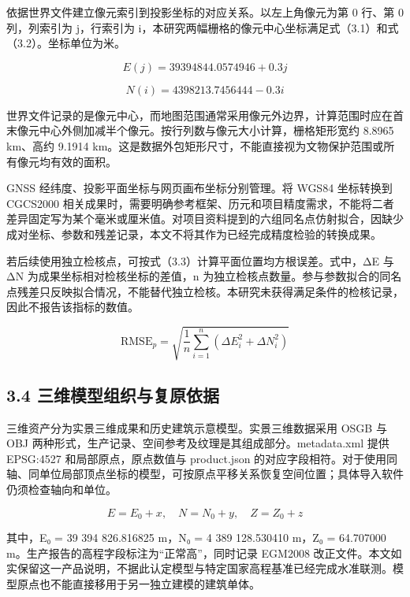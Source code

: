 \documentclass[UTF8,a4paper,zihao=-4]{ctexart}
\begin{document}
依据世界文件建立像元索引到投影坐标的对应关系。以左上角像元为第 0 行、第 0 列，列索引为 j，行索引为 i，本研究两幅栅格的像元中心坐标满足式（3.1）和式（3.2）。坐标单位为米。


\begin{equation}E(j)=39394844.0574946+0.3j\tag{3.1}\end{equation}

\begin{equation}N(i)=4398213.7456444-0.3i\tag{3.2}\end{equation}

世界文件记录的是像元中心，而地图范围通常采用像元外边界，计算范围时应在首末像元中心外侧加减半个像元。按行列数与像元大小计算，栅格矩形宽约 8.8965 km、高约 9.1914 km。这是数据外包矩形尺寸，不能直接视为文物保护范围或所有像元均有效的面积。


GNSS 经纬度、投影平面坐标与网页画布坐标分别管理。将 WGS84 坐标转换到 CGCS2000 相关成果时，需要明确参考框架、历元和项目精度需求，不能将二者差异固定写为某个毫米或厘米值。对项目资料提到的六组同名点仿射拟合，因缺少成对坐标、参数和残差记录，本文不将其作为已经完成精度检验的转换成果。


若后续使用独立检核点，可按式（3.3）计算平面位置均方根误差。式中，ΔE 与 ΔN 为成果坐标相对检核坐标的差值，n 为独立检核点数量。参与参数拟合的同名点残差只反映拟合情况，不能替代独立检核。本研究未获得满足条件的检核记录，因此不报告该指标的数值。


\begin{equation}\mathrm{RMSE}_{p}=\sqrt{\frac{1}{n}\sum_{i=1}^{n}(\Delta E_i^2+\Delta N_i^2)}\tag{3.3}\end{equation}

\subsection*{3.4 三维模型组织与复原依据}

三维资产分为实景三维成果和历史建筑示意模型。实景三维数据采用 OSGB 与 OBJ 两种形式，生产记录、空间参考及纹理是其组成部分。metadata.xml 提供 EPSG:4527 和局部原点，原点数值与 product.json 的对应字段相符。对于使用同轴、同单位局部顶点坐标的模型，可按原点平移关系恢复空间位置；具体导入软件仍须检查轴向和单位。


\begin{equation}E=E_0+x,\quad N=N_0+y,\quad Z=Z_0+z\tag{3.4}\end{equation}

其中，E₀ = 39 394 826.816825 m，N₀ = 4 389 128.530410 m，Z₀ = 64.707000 m。生产报告的高程字段标注为“正常高”，同时记录 EGM2008 改正文件。本文如实保留这一产品说明，不据此认定模型与特定国家高程基准已经完成水准联测。模型原点也不能直接移用于另一独立建模的建筑单体。
\end{document}
